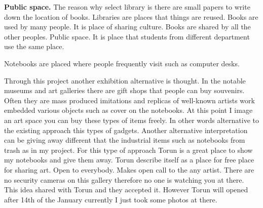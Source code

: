 \textbf{Public space.} The reason why select library is there are small papers to write down the location of books. Libraries are places that things are reused. Books are used by many people. It is place of sharing culture. Books are shared by all the other peoples. Public space. It is place that students from different department use the same place.

Notebooks are placed where people frequently visit such as computer desks.





Through this project another exhibition alternative is thought. In the notable museums and art galleries there are gift shops that people can buy souvenirs. Often they are mass produced imitations and replicas of well-known artists work embedded various objects such as cover on the notebooks. At this point I image an art space you can buy these types of items freely. In other words alternative to the existing approach this types of gadgets. Another alternative interpretation can be giving away different that the industrial items such as notebooks from trash as in my project. For this type of approach Torun is a great place to show my notebooks and give them away. Torun describe itself as a place for free place for sharing art. Open to everybody. Makes open call to the any artist. There are no security cameras on this gallery therefore no one is watching you at there. This idea shared with Torun and they accepted it. However Torun will opened after 14th of the January currently I just took some photos at there.

